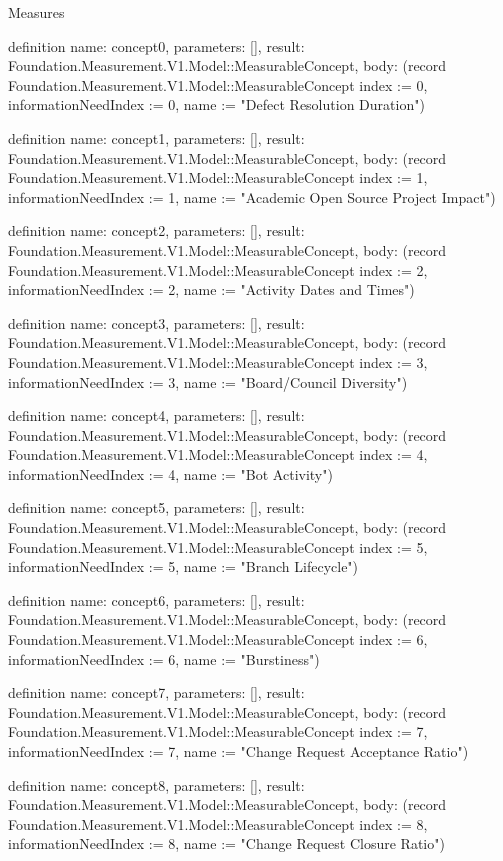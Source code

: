 \begin{lexlean}{Measures}
\begin{semanticmodule}
definition{
  name: concept0,
  parameters: [],
  result: Foundation.Measurement.V1.Model::MeasurableConcept,
  body: (record Foundation.Measurement.V1.Model::MeasurableConcept {index := 0, informationNeedIndex := 0, name := "Defect Resolution Duration"})
}

definition{
  name: concept1,
  parameters: [],
  result: Foundation.Measurement.V1.Model::MeasurableConcept,
  body: (record Foundation.Measurement.V1.Model::MeasurableConcept {index := 1, informationNeedIndex := 1, name := "Academic Open Source Project Impact"})
}

definition{
  name: concept2,
  parameters: [],
  result: Foundation.Measurement.V1.Model::MeasurableConcept,
  body: (record Foundation.Measurement.V1.Model::MeasurableConcept {index := 2, informationNeedIndex := 2, name := "Activity Dates and Times"})
}

definition{
  name: concept3,
  parameters: [],
  result: Foundation.Measurement.V1.Model::MeasurableConcept,
  body: (record Foundation.Measurement.V1.Model::MeasurableConcept {index := 3, informationNeedIndex := 3, name := "Board/Council Diversity"})
}

definition{
  name: concept4,
  parameters: [],
  result: Foundation.Measurement.V1.Model::MeasurableConcept,
  body: (record Foundation.Measurement.V1.Model::MeasurableConcept {index := 4, informationNeedIndex := 4, name := "Bot Activity"})
}

definition{
  name: concept5,
  parameters: [],
  result: Foundation.Measurement.V1.Model::MeasurableConcept,
  body: (record Foundation.Measurement.V1.Model::MeasurableConcept {index := 5, informationNeedIndex := 5, name := "Branch Lifecycle"})
}

definition{
  name: concept6,
  parameters: [],
  result: Foundation.Measurement.V1.Model::MeasurableConcept,
  body: (record Foundation.Measurement.V1.Model::MeasurableConcept {index := 6, informationNeedIndex := 6, name := "Burstiness"})
}

definition{
  name: concept7,
  parameters: [],
  result: Foundation.Measurement.V1.Model::MeasurableConcept,
  body: (record Foundation.Measurement.V1.Model::MeasurableConcept {index := 7, informationNeedIndex := 7, name := "Change Request Acceptance Ratio"})
}

definition{
  name: concept8,
  parameters: [],
  result: Foundation.Measurement.V1.Model::MeasurableConcept,
  body: (record Foundation.Measurement.V1.Model::MeasurableConcept {index := 8, informationNeedIndex := 8, name := "Change Request Closure Ratio"})
}


\end{semanticmodule}
\end{lexlean}
